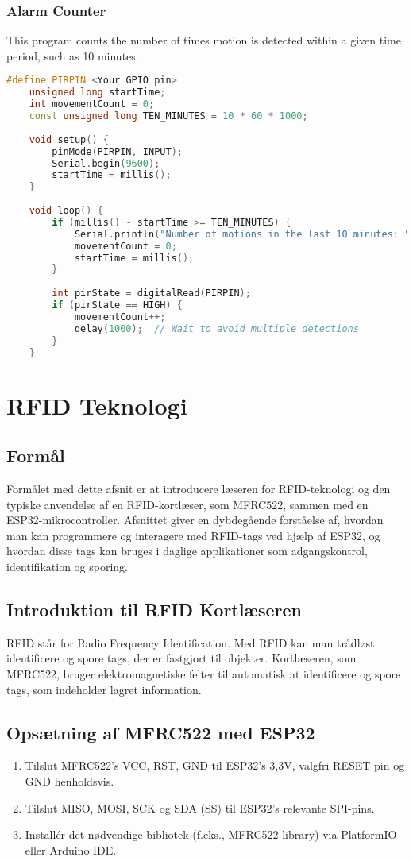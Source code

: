 \subsubsection*{Alarm Counter}
This program counts the number of times motion is detected within a given time period, such as 10 minutes.
\begin{lstlisting}[language=C++]
	#define PIRPIN <Your GPIO pin>
	unsigned long startTime;
	int movementCount = 0;
	const unsigned long TEN_MINUTES = 10 * 60 * 1000;
	
	void setup() {
		pinMode(PIRPIN, INPUT);
		Serial.begin(9600);
		startTime = millis();
	}
	
	void loop() {
		if (millis() - startTime >= TEN_MINUTES) {
			Serial.println("Number of motions in the last 10 minutes: " + String(movementCount));
			movementCount = 0;
			startTime = millis();
		}
		
		int pirState = digitalRead(PIRPIN);
		if (pirState == HIGH) {
			movementCount++;
			delay(1000);  // Wait to avoid multiple detections
		}
	}
\end{lstlisting}

\section{RFID Teknologi}

\subsection*{Formål}
Formålet med dette afsnit er at introducere læseren for RFID-teknologi og den typiske anvendelse af en RFID-kortlæser, som MFRC522, sammen med en ESP32-mikrocontroller. Afsnittet giver en dybdegående forståelse af, hvordan man kan programmere og interagere med RFID-tags ved hjælp af ESP32, og hvordan disse tags kan bruges i daglige applikationer som adgangskontrol, identifikation og sporing.

\subsection*{Introduktion til RFID Kortlæseren}
RFID står for Radio Frequency Identification. Med RFID kan man trådløst identificere og spore tags, der er fastgjort til objekter. Kortlæseren, som MFRC522, bruger elektromagnetiske felter til automatisk at identificere og spore tags, som indeholder lagret information.

\subsection*{Opsætning af MFRC522 med ESP32}
\begin{enumerate}
	\item Tilslut MFRC522's VCC, RST, GND til ESP32's 3,3V, valgfri RESET pin og GND henholdsvis.
	\item Tilslut MISO, MOSI, SCK og SDA (SS) til ESP32's relevante SPI-pins.
	\item Installér det nødvendige bibliotek (f.eks., MFRC522 library) via PlatformIO eller Arduino IDE.
\end{enumerate}

